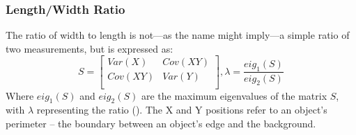 \documentclass[letterpaper, notitlepage]{report}
\begin{document}
{%

\subsubsection{Length/Width Ratio}
\label{sec:length-width-ratio}
The ratio of width to length is not---as the name might imply---a simple ratio of two measurements, but is expressed as:
\begin{equation}
S = 
	\begin{bmatrix}
	Var(X) & Cov(XY) \\[0.3em]
	Cov(XY) & Var(Y) \\[0.3em]
	\end{bmatrix},
\lambda = \frac {eig_{1}(S)} {eig_{2}(S)}
\end{equation}
Where $eig_{1}(S)$ and $eig_{2}(S)$ are the maximum eigenvalues of the matrix $S$, with $\lambda$ representing the ratio (\cite{Lin2017-xq}). The X and Y positions refer to an object's perimeter -- the boundary between an object's edge and the background.



}
\end{document}

